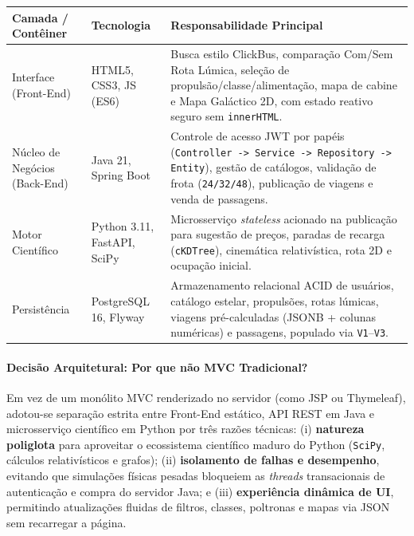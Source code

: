 \documentclass[12pt, a4paper]{article}
\begin{document}
\begin{table}[H]
\centering
\renewcommand{\arraystretch}{1.25}
\begin{tabularx}{\textwidth}{l l X}
\toprule
\textbf{Camada / Contêiner} & \textbf{Tecnologia} & \textbf{Responsabilidade Principal} \\
\midrule
Interface (Front-End) & HTML5, CSS3, JS (ES6) & Busca estilo ClickBus, comparação Com/Sem Rota Lúmica, seleção de propulsão/classe/alimentação, mapa de cabine e Mapa Galáctico 2D, com estado reativo seguro sem \texttt{innerHTML}. \\
Núcleo de Negócios (Back-End) & Java 21, Spring Boot & Controle de acesso JWT por papéis (\texttt{Controller -> Service -> Repository -> Entity}), gestão de catálogos, validação de frota (\texttt{24/32/48}), publicação de viagens e venda de passagens. \\
Motor Científico & Python 3.11, FastAPI, SciPy & Microsserviço \textit{stateless} acionado na publicação para sugestão de preços, paradas de recarga (\texttt{cKDTree}), cinemática relativística, rota 2D e ocupação inicial. \\
Persistência & PostgreSQL 16, Flyway & Armazenamento relacional ACID de usuários, catálogo estelar, propulsões, rotas lúmicas, viagens pré-calculadas (JSONB + colunas numéricas) e passagens, populado via \texttt{V1}--\texttt{V3}. \\
\bottomrule
\end{tabularx}
\end{table}

\paragraph{Decisão Arquitetural: Por que não MVC Tradicional?}
Em vez de um monólito MVC renderizado no servidor (como JSP ou Thymeleaf), adotou-se separação estrita entre Front-End estático, API REST em Java e microsserviço científico em Python por três razões técnicas: (i) \textbf{natureza poliglota} para aproveitar o ecossistema científico maduro do Python (\texttt{SciPy}, cálculos relativísticos e grafos); (ii) \textbf{isolamento de falhas e desempenho}, evitando que simulações físicas pesadas bloqueiem as \textit{threads} transacionais de autenticação e compra do servidor Java; e (iii) \textbf{experiência dinâmica de UI}, permitindo atualizações fluidas de filtros, classes, poltronas e mapas via JSON sem recarregar a página.

\end{document}
